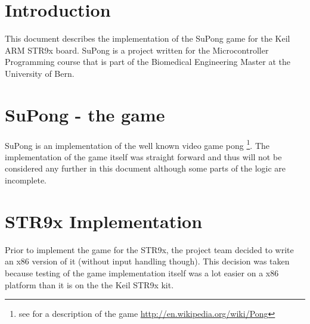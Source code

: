 
\def\docTitle{SuPong}
\def\docSubtitle{Project documentation}
\def\docAuthors{\textit{The F-Team}\\ Fabian Page \\Fabio Bernasconi}

\def\imgPrefix{images}



\pagestyle{fancyplain}
\chead[]{}
\cfoot[\thepage]{\thepage}  







\newpage
\thispagestyle{empty} %
\tableofcontents

\newpage
\section{Introduction}
This document describes the implementation of the SuPong game for the Keil ARM
STR9x board. SuPong is a project written for the Microcontroller
Programming course that is part of the Biomedical Engineering Master at the
University of Bern.

\section{SuPong - the game}
SuPong is an implementation of the well known video game pong
\footnote{see for a description of the game
\url{http://en.wikipedia.org/wiki/Pong}}. The implementation of the game itself
was straight forward and thus will not be considered any further in this
document although some parts of the logic are incomplete.

\section{STR9x Implementation}
Prior to implement the game for the STR9x, the project team decided to write an
x86 version of it (without input handling though). This decision was taken
because testing of the game implementation itself was a lot easier on a x86
platform than it is on the the Keil STR9x kit. 

